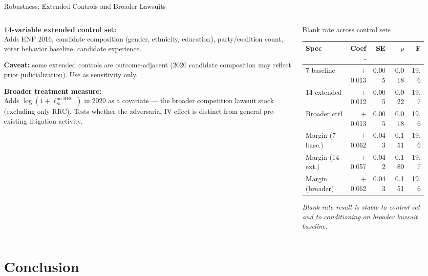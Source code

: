 \documentclass[aspectratio=169,10pt]{beamer}
\begin{document}
\begin{frame}{Robustness: Extended Controls and Broader Lawsuits}
\begin{columns}[T]
\begin{column}{0.55\textwidth}
\textbf{14-variable extended control set:}\\
Adds ENP 2016, candidate composition (gender, ethnicity, education), party/coalition count, voter behavior baseline, candidate experience.
\bigskip

\textbf{Caveat:} some extended controls are outcome-adjacent (2020 candidate composition may reflect prior judicialization). Use as sensitivity only.
\bigskip

\textbf{Broader treatment measure:}\\
Adds $\log(1 + \ell_m^{\text{no-RRC}})$ in 2020 as a covariate --- the broader competition lawsuit stock (excluding only RRC). Tests whether the adversarial IV effect is distinct from general pre-existing litigation activity.
\end{column}
\begin{column}{0.43\textwidth}
\begin{block}{Blank rate across control sets}
  \footnotesize
  \renewcommand{\arraystretch}{1.2}
  \begin{tabular}{lrrrr}
    \toprule
    Spec & Coef. & SE & $p$ & F \\
    \midrule
    7 baseline & $+$0.013 & 0.005 & 0.018 & 19.6 \\
    14 extended & $+$0.012 & 0.005 & 0.022 & 19.7 \\
    Broader ctrl & $+$0.013 & 0.005 & 0.018 & 19.6 \\
    \midrule
    Margin (7 base.) & $+$0.062 & 0.043 & 0.151 & 19.6 \\
    Margin (14 ext.) & $+$0.057 & 0.042 & 0.180 & 19.7 \\
    Margin (broader) & $+$0.062 & 0.043 & 0.151 & 19.6 \\
    \bottomrule
  \end{tabular}
\end{block}
\footnotesize\textit{Blank rate result is stable to control set and to conditioning on broader lawsuit baseline.}
\end{column}
\end{columns}
\end{frame}


\section{Conclusion}
\end{document}
